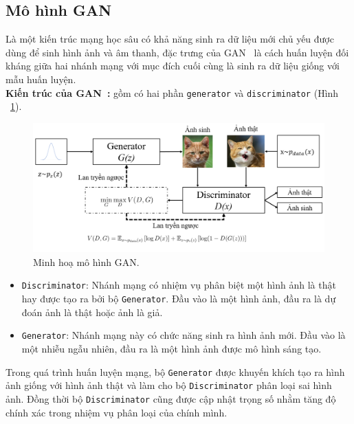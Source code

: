  \subsection{Mô hình GAN}
 Là một kiến trúc mạng học sâu có khả năng sinh ra dữ liệu mới chủ yếu được dùng để sinh hình ảnh và âm thanh, đặc trưng của GAN~\cite{Goodfellow2014GenerativeAN} là cách huấn luyện đối kháng giữa hai nhánh mạng với mục đích cuối cùng là sinh ra dữ liệu giống với mẫu huấn luyện.\\
 \textbf{Kiến trúc của GAN~\cite{Goodfellow2014GenerativeAN}:} gồm có hai phần \texttt{generator} và \texttt{discriminator} (Hình ~\ref{fig:model-gan-1}).
 \begin{figure}[htp]
 	\centering
 	\includegraphics[width=0.9\linewidth]{Images/model-gan-1.png}
 	\caption{
 		Minh hoạ mô hình GAN.
 	}
 	\label{fig:model-gan-1}
 \end{figure}
 \begin{itemize}
 	 \item \texttt{Discriminator}: Nhánh mạng có nhiệm vụ phân biệt một hình ảnh là thật hay được tạo ra bởi bộ \texttt{Generator}. Đầu vào là một hình ảnh, đầu ra là dự đoán ảnh là thật hoặc ảnh là giả.
 	 	
 	\item \texttt{Generator}: Nhánh mạng này có chức năng sinh ra hình ảnh mới. Đầu vào là một nhiễu ngẫu nhiên, đầu ra là một hình ảnh được mô hình sáng tạo.	
 \end{itemize}
Trong quá trình huấn luyện mạng, bộ \texttt{Generator} được khuyến khích tạo ra hình ảnh giống với hình ảnh thật và làm cho bộ \texttt{Discriminator} phân loại sai hình ảnh. Đồng thời bộ \texttt{Discriminator} cũng được cập nhật trọng số nhằm tăng độ chính xác trong nhiệm vụ phân loại của chính mình.

